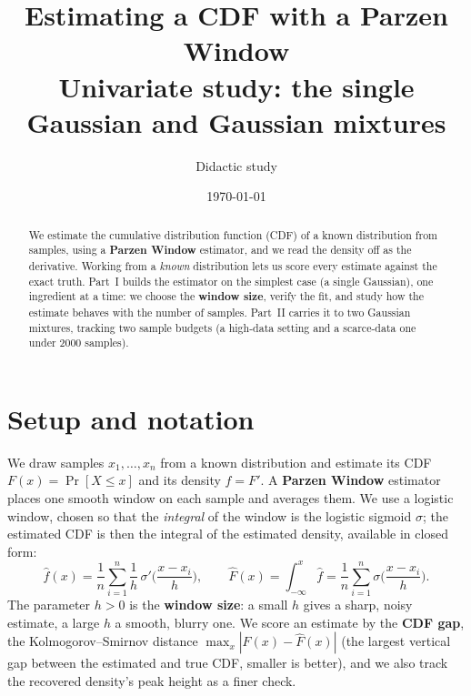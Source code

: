 \documentclass[11pt]{article}
\title{Estimating a CDF with a Parzen Window\\
\large Univariate study: the single Gaussian and Gaussian mixtures}
\author{Didactic study}
\date{\today}
\newcommand{\Fhat}{\widehat{F}}
\newcommand{\fhat}{\widehat{f}}
\begin{document}
\maketitle

\begin{abstract}
We estimate the cumulative distribution function (CDF) of a known distribution from samples, using a
\textbf{Parzen Window} estimator, and we read the density off as the derivative. Working from a
\emph{known} distribution lets us score every estimate against the exact truth. Part~I builds the
estimator on the simplest case (a single Gaussian), one ingredient at a time: we choose the
\textbf{window size}, verify the fit, and study how the estimate behaves with the number of samples.
Part~II carries it to two Gaussian mixtures, tracking two sample budgets (a high-data setting and a
scarce-data one under 2000 samples).
\end{abstract}

\section{Setup and notation}

We draw samples $x_1,\dots,x_n$ from a known distribution and estimate its CDF $F(x)=\Pr[X\le x]$ and
its density $f=F'$. A \textbf{Parzen Window} estimator places one smooth window on each sample and
averages them. We use a logistic window, chosen so that the \emph{integral} of the window is the
logistic sigmoid $\sigma$; the estimated CDF is then the integral of the estimated density, available
in closed form:
\begin{equation}
  \fhat(x)=\frac1n\sum_{i=1}^n \frac1h\,\sigma'\!\Big(\frac{x-x_i}{h}\Big),
  \qquad
  \Fhat(x)=\int_{-\infty}^x \fhat
          =\frac1n\sum_{i=1}^n \sigma\!\Big(\frac{x-x_i}{h}\Big).
  \label{eq:parzen}
\end{equation}
The parameter $h>0$ is the \textbf{window size}: a small $h$ gives a sharp, noisy estimate, a large
$h$ a smooth, blurry one. We score an estimate by the \textbf{CDF gap}, the Kolmogorov--Smirnov
distance $\max_x|F(x)-\Fhat(x)|$ (the largest vertical gap between the estimated and true CDF, smaller
is better), and we also track the recovered density's peak height as a finer check.
\end{document}
